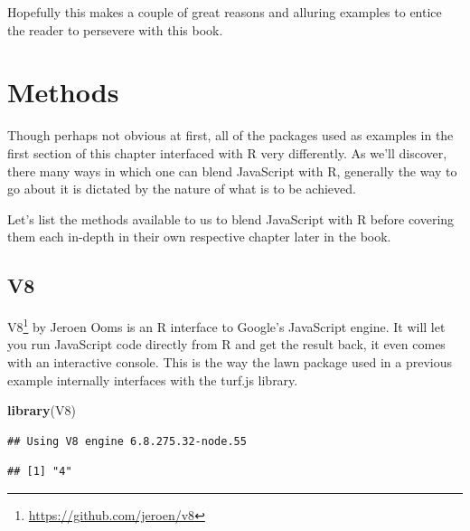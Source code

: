 \documentclass[
]{krantz}
\makeatletter
\newenvironment{Shaded}{\begin{snugshade}}{\end{snugshade}}
\newcommand{\CommentTok}[1]{\textcolor[rgb]{0.37,0.37,0.37}{\textit{#1}}}
\newcommand{\KeywordTok}[1]{\textcolor[rgb]{0.27,0.27,0.27}{\textbf{#1}}}
\newcommand{\NormalTok}[1]{#1}
\newcommand{\OperatorTok}[1]{\textcolor[rgb]{0.43,0.43,0.43}{\textbf{#1}}}
\newcommand{\StringTok}[1]{\textcolor[rgb]{0.5,0.5,0.5}{#1}}
\renewcommand{\href}[2]{#2\footnote{\url{#1}}}
\newenvironment{kframe}{%
\medskip{}
\setlength{\fboxsep}{.8em}
 \def\at@end@of@kframe{}%
 \ifinner\ifhmode%
  \def\at@end@of@kframe{\end{minipage}}%
  \begin{minipage}{\columnwidth}%
 \fi\fi%
 \def\FrameCommand##1{\hskip\@totalleftmargin \hskip-\fboxsep
 \colorbox{shadecolor}{##1}\hskip-\fboxsep
     \hskip-\linewidth \hskip-\@totalleftmargin \hskip\columnwidth}%
 \MakeFramed {\advance\hsize-\width
   \@totalleftmargin\z@ \linewidth\hsize
   \@setminipage}}%
 {\par\unskip\endMakeFramed%
 \at@end@of@kframe}
\renewenvironment{Shaded}{\begin{kframe}}{\end{kframe}}
\makeatother
\begin{document}
Hopefully this makes a couple of great reasons and alluring examples to entice the reader to persevere with this book.

\hypertarget{methods}{%
\section{Methods}\label{methods}}

Though perhaps not obvious at first, all of the packages used as examples in the first section of this chapter interfaced with R very differently. As we'll discover, there many ways in which one can blend JavaScript with R, generally the way to go about it is dictated by the nature of what is to be achieved.

Let's list the methods available to us to blend JavaScript with R before covering them each in-depth in their own respective chapter later in the book.

\hypertarget{v8}{%
\subsection{V8}\label{v8}}

\href{https://github.com/jeroen/v8}{V8} by Jeroen Ooms is an R interface to Google's JavaScript engine. It will let you run JavaScript code directly from R and get the result back, it even comes with an interactive console. This is the way the lawn package used in a previous example internally interfaces with the turf.js library.

\begin{Shaded}
\begin{Highlighting}[]
\KeywordTok{library}\NormalTok{(V8)}
\end{Highlighting}
\end{Shaded}

\begin{verbatim}
## Using V8 engine 6.8.275.32-node.55
\end{verbatim}

\begin{Shaded}
\end{Shaded}

\begin{verbatim}
## [1] "4"
\end{verbatim}
\end{document}
